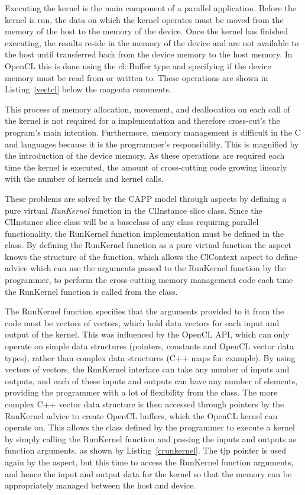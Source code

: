 \documentclass{sig-alternate-05-2015}
\begin{document}
Executing the kernel is the main component of a parallel application. Before the
kernel is run, the data on which the kernel operates must be moved from the
memory of the host to the memory of the device. Once the
kernel has finished executing, the results reside in the memory of the
device and are not available to the host until transferred
back from the device memory to the host memory. In OpenCL this
is done using the cl::Buffer type and specifying if the device memory
must be read from or written to. These operations are shown in Listing~\ref{vectcl} 
below the magenta comments. 

This process of memory allocation, movement, and
deallocation on each call of the kernel is not required for a \CPP implementation
and therefore cross-cut's the program's main intention. Furthermore, memory management 
is difficult in the C and \CPP languages because it is the programmer's
responsibility. This is magnified by the introduction of the device memory. 
As these operations are required each 
time the kernel is executed, the amount of cross-cutting code growing linearly 
with the number of kernels and kernel calls. 

These problems are solved by the CAPP model through aspects by defining
a pure virtual \textit{RunKernel} function in the ClInstance slice class. 
Since the ClInstance slice class will be a baseclass of any \CPP class requiring parallel 
functionality, the RunKernel function implementation must be defined in the 
\CPP class. By defining the RunKernel function as a pure virtual
function the aspect knows the structure of the function, which allows the 
ClContext aspect to define advice which can use the arguments passed to
the RunKernel function by the programmer, to perform the cross-cutting 
memory management code each time the RunKernel function is called from
the \CPP class.

The RunKernel function specifies that the arguments provided to it from the
\CPP code must be vectors of vectors, which hold data vectors for each input and
output of the kernel. This was influenced by the OpenCL API, which can only
operate on simple data structures (pointers, constants and OpenCL vector data
types), rather than complex data structures (C++ maps for example). 
By using vectors of vectors, the RunKernel interface can take any 
number of inputs and outputs, and each of these inputs and outputs can have any
number of elements, providing the programmer with a lot of flexibility from the
\CPP class. The more complex C++ vector data structure is then accessed through
pointers by the RunKernel advice to create OpenCL buffers, which the OpenCL kernel 
can operate on. This allows the \CPP class defined 
by the programmer to execute a kernel by simply calling the RunKernel function and 
passing the inputs and outputs as function arguments, as shown by Listing~\ref{crunkernel}. 
The tjp pointer is  used again by the aspect, but this time to access the RunKernel 
function arguments, and hence the input and output data for the kernel so that the memory can be
appropriately managed between the host and device.
\end{document}
